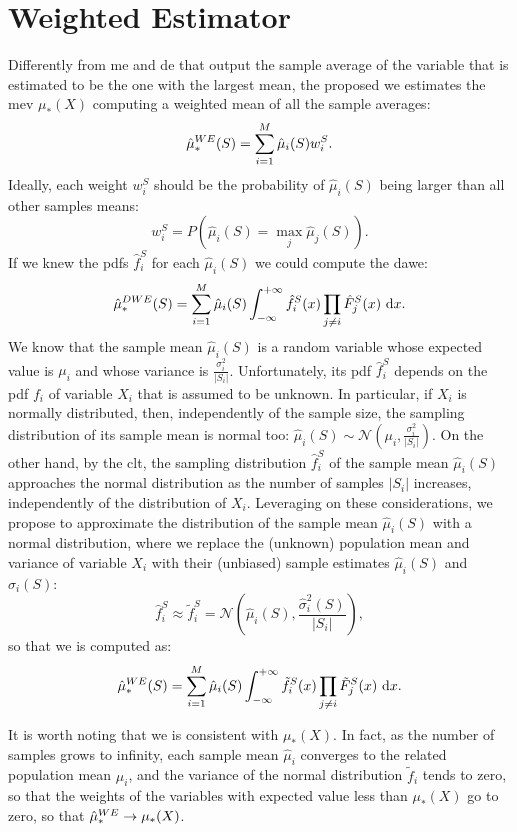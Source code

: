 \section{Weighted Estimator}
Differently from \gls{me} and \gls{de} that output the sample average of the variable that is estimated to be the one with the largest mean, the proposed \gls{we} estimates the \gls{mev} $\mu_*(X)$ computing a weighted mean of all the sample averages:
\begin{equation}\label{E:WE}
\hat\mu_*^{WE}(S) = \sum_{i=1}^M \hat\mu_i(S) w_i^S.
\end{equation}
Ideally, each weight $w_i^S$ should be the probability of $\hat\mu_i(S)$ being larger than all other samples means:  
$$w_i^S = P\left(\hat\mu_i(S) = \max_j \hat\mu_j(S)\right).$$
If we knew the \glspl{pdf} $\hat{f}_i^S$ for each $\hat\mu_i(S)$ we could compute the \gls{dawe}:
\begin{equation}\label{E:OptimalWE}
\hat\mu_*^{DWE}(S) = \sum_{i=1}^M \hat\mu_i(S)\int_{-\infty}^{+\infty} \hat{f}_i^S(x) \prod_{j\neq i}\hat{F}_j^S(x)~\mathrm{d}x.
\end{equation}
We know that the sample mean $\hat\mu_i(S)$ is a random variable whose expected value is $\mu_i$ and whose variance is $\frac{\sigma^2_i}{|S_i|}$.
Unfortunately, its \gls{pdf} $\hat f_i^S$ depends on the \gls{pdf} $f_i$ of variable $X_i$ that is assumed to be unknown.
In particular, if $X_i$ is normally distributed, then, independently of the sample size, the sampling distribution of its sample mean is normal too: $\hat\mu_i(S)\sim\mathcal{N}\left(\mu_i,\frac{\sigma_i^2}{|S_i|}\right)$.
On the other hand, by the \gls{clt}, the sampling distribution $\hat f_i^S$ of the sample mean $\hat\mu_i(S)$ approaches the normal distribution as the number of samples $|S_i|$ increases, independently of the distribution of $X_i$.
Leveraging on these considerations, we propose to approximate the distribution of the sample mean $\hat\mu_i(S)$ with a normal distribution, where we replace the (unknown) population mean and variance of variable $X_i$ with their (unbiased) sample estimates $\hat\mu_i(S)$ and $\hat\sigma_i(S)$:
$$\hat f_i^S \approx \tilde f_i^S = \mathcal{N}\left(\hat\mu_i(S),\frac{\hat\sigma^2_i(S)}{|S_i|}\right),$$
so that \gls{we} is computed as:
\begin{equation}\label{E:WE2}
\hat\mu_*^{WE}(S) = \sum_{i=1}^M \hat\mu_i(S)\int_{-\infty}^{+\infty} \tilde{f}_i^S(x) \prod_{j\neq i}\tilde{F}_j^S(x)~\mathrm{d}x.
\end{equation}

It is worth noting that \gls{we} is consistent with $\mu_*(X)$. In fact, as the number of samples grows to infinity, each sample mean $\hat\mu_i$ converges to the related population mean $\mu_i$, and the variance of the normal distribution $\tilde f_i$ tends to zero, so that the weights of the variables with expected value less than $\mu_*(X)$ go to zero, so that $\hat\mu_*^{WE} \rightarrow \mu_*(X)$.

